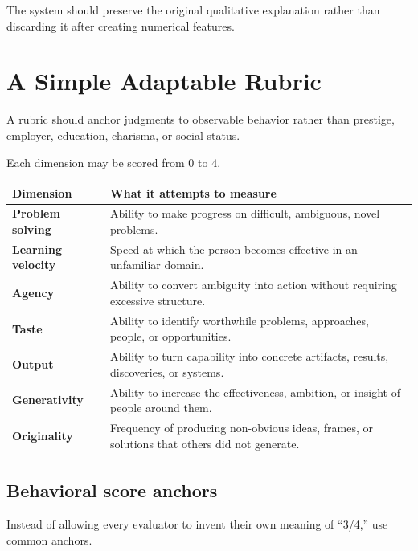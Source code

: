 \documentclass[11pt]{article}
\begin{document}
The system should preserve the original qualitative explanation rather than
discarding it after creating numerical features.

\section{A Simple Adaptable Rubric}

A rubric should anchor judgments to observable behavior rather than prestige,
employer, education, charisma, or social status.

Each dimension may be scored from \(0\) to \(4\).

\begin{center}
\begin{tabularx}{\textwidth}{>{\bfseries}p{} X}
\toprule
Dimension & What it attempts to measure \\
\midrule
Problem solving &
Ability to make progress on difficult, ambiguous, novel problems. \\

Learning velocity &
Speed at which the person becomes effective in an unfamiliar domain. \\

Agency &
Ability to convert ambiguity into action without requiring excessive structure. \\

Taste &
Ability to identify worthwhile problems, approaches, people, or opportunities. \\

Output &
Ability to turn capability into concrete artifacts, results, discoveries, or systems. \\

Generativity &
Ability to increase the effectiveness, ambition, or insight of people around them. \\

Originality &
Frequency of producing non-obvious ideas, frames, or solutions that others did not generate. \\
\bottomrule
\end{tabularx}
\end{center}

\subsection{Behavioral score anchors}

Instead of allowing every evaluator to invent their own meaning of ``3/4,''
use common anchors.
\end{document}

